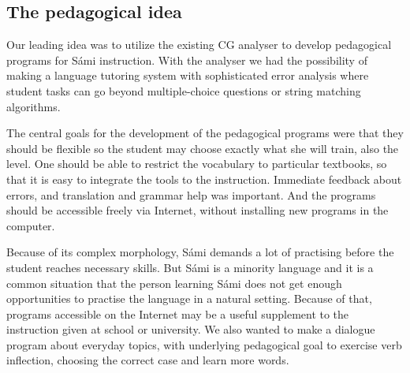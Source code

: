 \documentclass[11pt]{article}
\begin{document}

\subsection{The pedagogical idea} \label{pedidea}

Our leading idea was to utilize the existing CG analyser to develop pedagogical programs for Sámi instruction.  With the analyser we had the possibility of making a language tutoring system with sophisticated error analysis where student tasks can go beyond multiple-choice questions or string matching algorithms. 

The central goals for the development of the pedagogical programs were that they should be flexible so the student may choose exactly what she will train, also the level. One should be able to restrict the vocabulary to particular textbooks, so that it is easy to integrate the tools to the instruction. Immediate feedback about errors, and translation and grammar help was important. And the programs should be accessible freely via Internet, without installing new programs in the computer.

Because of its complex morphology, Sámi demands a lot of practising before the student reaches necessary skills. But Sámi is a minority language and it is a common situation that the person learning Sámi does not get enough opportunities to practise the language in a natural setting. Because of that, programs accessible on the Internet may be a useful supplement to the instruction given at school or university. We also wanted to make a dialogue program about everyday topics, with underlying pedagogical goal to exercise verb inflection, choosing the correct case and learn more words. 
\end{document}
